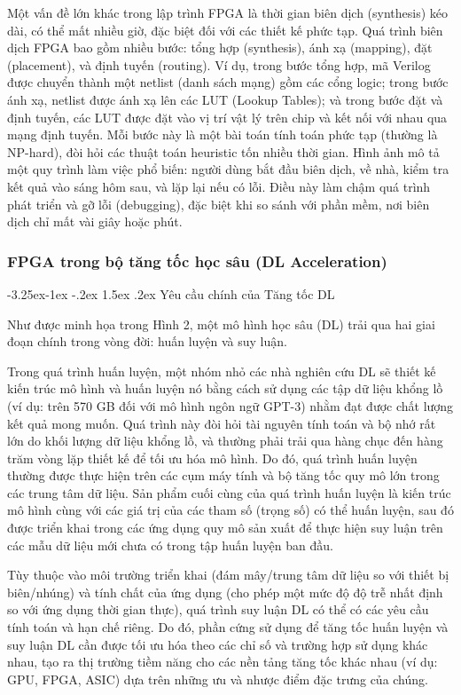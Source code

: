 \documentclass[a4paper]{article}
\makeatletter
\newcounter {subsubsubsection}[subsubsection]
\newcommand\subsubsubsection{\@startsection{subsubsubsection}{4}{\z@}%
                                     {-3.25ex\@plus -1ex \@minus -.2ex}%
                                     {1.5ex \@plus .2ex}%
                                     {\normalfont\normalsize\bfseries}}
\makeatother
\begin{document}
\begin{itemize}
    Một vấn đề lớn khác trong lập trình FPGA là thời gian biên dịch (synthesis) kéo dài, có thể mất nhiều giờ, đặc biệt đối với các thiết kế phức tạp. Quá trình biên dịch FPGA bao gồm nhiều bước: tổng hợp (synthesis), ánh xạ (mapping), đặt (placement), và định tuyến (routing). Ví dụ, trong bước tổng hợp, mã Verilog được chuyển thành một netlist (danh sách mạng) gồm các cổng logic; trong bước ánh xạ, netlist được ánh xạ lên các LUT (Lookup Tables); và trong bước đặt và định tuyến, các LUT được đặt vào vị trí vật lý trên chip và kết nối với nhau qua mạng định tuyến. Mỗi bước này là một bài toán tính toán phức tạp (thường là NP-hard), đòi hỏi các thuật toán heuristic tốn nhiều thời gian. Hình ảnh mô tả một quy trình làm việc phổ biến: người dùng bắt đầu biên dịch, về nhà, kiểm tra kết quả vào sáng hôm sau, và lặp lại nếu có lỗi. Điều này làm chậm quá trình phát triển và gỡ lỗi (debugging), đặc biệt khi so sánh với phần mềm, nơi biên dịch chỉ mất vài giây hoặc phút.

\end{itemize}
\subsubsection{FPGA trong bộ tăng tốc học sâu (DL Acceleration)}
\subsubsubsection{Yêu cầu chính của Tăng tốc DL }

Như được minh họa trong Hình 2, một mô hình học sâu (DL) trải qua hai giai đoạn chính trong vòng đời: huấn luyện và suy luận.

Trong quá trình huấn luyện, một nhóm nhỏ các nhà nghiên cứu DL sẽ thiết kế kiến trúc mô hình và huấn luyện nó bằng cách sử dụng các tập dữ liệu khổng lồ (ví dụ: trên 570 GB đối với mô hình ngôn ngữ GPT-3) nhằm đạt được chất lượng kết quả mong muốn. Quá trình này đòi hỏi tài nguyên tính toán và bộ nhớ rất lớn do khối lượng dữ liệu khổng lồ, và thường phải trải qua hàng chục đến hàng trăm vòng lặp thiết kế để tối ưu hóa mô hình. Do đó, quá trình huấn luyện thường được thực hiện trên các cụm máy tính và bộ tăng tốc quy mô lớn trong các trung tâm dữ liệu. Sản phẩm cuối cùng của quá trình huấn luyện là kiến trúc mô hình cùng với các giá trị của các tham số (trọng số) có thể huấn luyện, sau đó được triển khai trong các ứng dụng quy mô sản xuất để thực hiện suy luận trên các mẫu dữ liệu mới chưa có trong tập huấn luyện ban đầu.

Tùy thuộc vào môi trường triển khai (đám mây/trung tâm dữ liệu so với thiết bị biên/nhúng) và tính chất của ứng dụng (cho phép một mức độ độ trễ nhất định so với ứng dụng thời gian thực), quá trình suy luận DL có thể có các yêu cầu tính toán và hạn chế riêng. Do đó, phần cứng sử dụng để tăng tốc huấn luyện và suy luận DL cần được tối ưu hóa theo các chỉ số và trường hợp sử dụng khác nhau, tạo ra thị trường tiềm năng cho các nền tảng tăng tốc khác nhau (ví dụ: GPU, FPGA, ASIC) dựa trên những ưu và nhược điểm đặc trưng của chúng.
\end{document}

